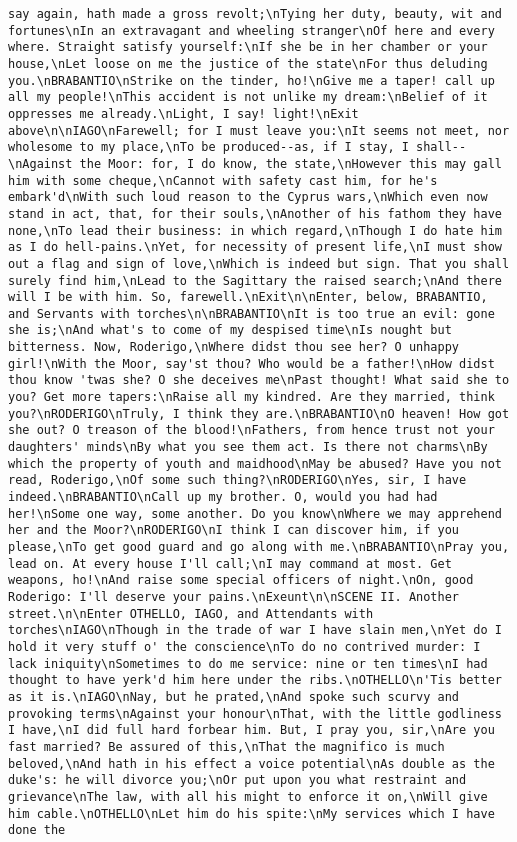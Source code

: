 \begin{verbatim}
say again, hath made a gross revolt;\nTying her duty, beauty, wit and fortunes\nIn an extravagant and wheeling stranger\nOf here and every where. Straight satisfy yourself:\nIf she be in her chamber or your house,\nLet loose on me the justice of the state\nFor thus deluding you.\nBRABANTIO\nStrike on the tinder, ho!\nGive me a taper! call up all my people!\nThis accident is not unlike my dream:\nBelief of it oppresses me already.\nLight, I say! light!\nExit above\n\nIAGO\nFarewell; for I must leave you:\nIt seems not meet, nor wholesome to my place,\nTo be produced--as, if I stay, I shall--\nAgainst the Moor: for, I do know, the state,\nHowever this may gall him with some cheque,\nCannot with safety cast him, for he's embark'd\nWith such loud reason to the Cyprus wars,\nWhich even now stand in act, that, for their souls,\nAnother of his fathom they have none,\nTo lead their business: in which regard,\nThough I do hate him as I do hell-pains.\nYet, for necessity of present life,\nI must show out a flag and sign of love,\nWhich is indeed but sign. That you shall surely find him,\nLead to the Sagittary the raised search;\nAnd there will I be with him. So, farewell.\nExit\n\nEnter, below, BRABANTIO, and Servants with torches\n\nBRABANTIO\nIt is too true an evil: gone she is;\nAnd what's to come of my despised time\nIs nought but bitterness. Now, Roderigo,\nWhere didst thou see her? O unhappy girl!\nWith the Moor, say'st thou? Who would be a father!\nHow didst thou know 'twas she? O she deceives me\nPast thought! What said she to you? Get more tapers:\nRaise all my kindred. Are they married, think you?\nRODERIGO\nTruly, I think they are.\nBRABANTIO\nO heaven! How got she out? O treason of the blood!\nFathers, from hence trust not your daughters' minds\nBy what you see them act. Is there not charms\nBy which the property of youth and maidhood\nMay be abused? Have you not read, Roderigo,\nOf some such thing?\nRODERIGO\nYes, sir, I have indeed.\nBRABANTIO\nCall up my brother. O, would you had had her!\nSome one way, some another. Do you know\nWhere we may apprehend her and the Moor?\nRODERIGO\nI think I can discover him, if you please,\nTo get good guard and go along with me.\nBRABANTIO\nPray you, lead on. At every house I'll call;\nI may command at most. Get weapons, ho!\nAnd raise some special officers of night.\nOn, good Roderigo: I'll deserve your pains.\nExeunt\n\nSCENE II. Another street.\n\nEnter OTHELLO, IAGO, and Attendants with torches\nIAGO\nThough in the trade of war I have slain men,\nYet do I hold it very stuff o' the conscience\nTo do no contrived murder: I lack iniquity\nSometimes to do me service: nine or ten times\nI had thought to have yerk'd him here under the ribs.\nOTHELLO\n'Tis better as it is.\nIAGO\nNay, but he prated,\nAnd spoke such scurvy and provoking terms\nAgainst your honour\nThat, with the little godliness I have,\nI did full hard forbear him. But, I pray you, sir,\nAre you fast married? Be assured of this,\nThat the magnifico is much beloved,\nAnd hath in his effect a voice potential\nAs double as the duke's: he will divorce you;\nOr put upon you what restraint and grievance\nThe law, with all his might to enforce it on,\nWill give him cable.\nOTHELLO\nLet him do his spite:\nMy services which I have done the 
\end{verbatim}
